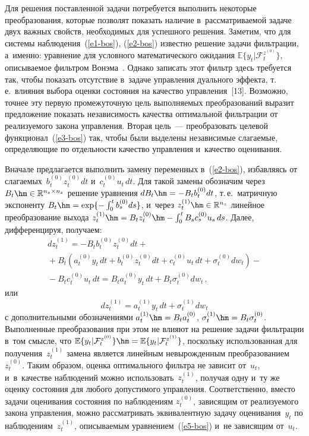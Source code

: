 \begin{multicols}{2}
     Для решения поставленной задачи потребуется выполнить некоторые 
преобразования, которые позволят показать наличие в~рассматриваемой 
задаче двух важных свойств, необходимых для успешного решения. Заметим, 
что для системы наблюдения~(\ref{e1-bos}), (\ref{e2-bos}) известно решение 
задачи фильтрации, а~именно: уравнение для условного математического 
ожидания $\mathbb{E}\{y_t\vert \mathcal{F}_t^{z^{(0)}}\}$, описываемое 
фильтром Вонэма~\cite{11-bos}. Однако записать этот фильтр здесь 
требуется так, чтобы показать отсутствие в~задаче управления дуального 
эффекта, т.\,е.\ влияния выбора оценки состояния на качество 
управления~[13]. Возможно, точнее эту первую промежуточную цель 
выполняемых преобразований выразит предложение показать независимость 
качества оптимальной фильтрации от реализуемого закона управления. 
Вторая цель~--- преобразовать целевой  
функционал~(\ref{e3-bos}) так, чтобы были выделены независимые 
слагаемые, определяющие по отдельности качество управления и~качество 
оценивания.
     
     Вначале предлагается выполнить замену переменных в~(\ref{e2-bos}), 
избавляясь от слагаемых~$b_t^{(0)} z_t^{(0)}dt$ и~$c_t^{(0)} u_t \,dt$. Для 
такой замены обозначим через $B_t\hm\in \mathbb{R}^{n_z\times n_z}$ 
решение уравнения $dB_t\hm= -B_t b_t^{(0)} dt$, т.\,е.\ матричную экспоненту 
$B_t\hm= \exp \{ -\int\nolimits_0^t b_s^{(0)}ds\}$, и~через $z_t^{(1)}\hm\in 
\mathbb{R}^{n_z}$ линейное преобразование выхода $z_t^{(1)}\hm= B_t 
z_t^{(0)} \hm- \int\nolimits_0^t B_s c_s^{(0)} u_s\, ds$. Далее, дифференцируя,  
получаем: 
     \begin{multline*}
     dz_t^{(1)} = -B_t b_t^{(0)} z_t^{(0)} dt +{}\\
     {}+ B_t \left( a_t^{(0)} y_t \,dt +b_t^{(0)} z_t^{(0)}dt +c_t^{(0)} u_t\,dt 
+\sigma_t^{(0)}dw_t\right)-{}\\
     {}- B_t c_t^{(0)} u_t \,dt = B_t a_t^{(0)} y_t \,dt +B_t \sigma_t^{(0)} dw_t\,,
     \end{multline*}
      или 
     \begin{equation}
     dz_t^{(1)} =a_t^{(1)}y_t \,dt +\sigma_t^{(1)}dw_t
     \label{e5-bos}
     \end{equation}
с дополнительными обозначениями $a_t^{(1)} \hm= B_t a_t^{(0)}$, 
$\sigma_t^{(1)}\hm= B_t \sigma_t^{(0)}$. Выполненные преобразования при 
этом не влияют на решение задачи фильтрации в~том смысле, что 
$\mathbb{E}\{ y_t\vert \mathcal{F}_t^{z^{(0)}}\} \hm= \mathbb{E} \{ y_t\vert 
\mathcal{F}_t^{z^{(1)}}\}$, поскольку использованная для получения~$z_t^{(1)}$ 
замена является линейным невырожденным преобразованием $z_t^{(0)}$. 
Таким образом, оценка оптимального фильтра не зависит от~$u_t$, 
и~в~качестве наблюдений можно использовать~$z_t^{(1)}$, получая одну 
и~ту же оценку состояния для любого допустимого управ\-ле\-ния. 
Соответственно, вместо задачи оценивания состояния по наблюдениям 
$z_t^{(0)}$, зависящим от реализуемого закона управ\-ле\-ния, можно 
рас\-смат\-ри\-вать эквивалентную задачу оценивания~$y_t$ по 
наблюдениям~$z_t^{(1)}$, опи\-сы\-ва\-емым урав\-не\-ни\-ем~(\ref{e5-bos}) и~не 
зависящим от~$u_t$.


\end{multicols}
